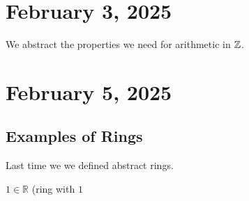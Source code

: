 \documentclass[11pt]{article}
\begin{document}

\section{February 3, 2025}
We abstract the properties we need for arithmetic in \(\mathbb Z\).
\section{February 5, 2025}

\subsection{Examples of Rings}
Last time we we defined abstract rings.
\begin{remark}
    \(1 \in \mathbb{R}\) (ring with \(1\)
\end{remark}
\end{document}
